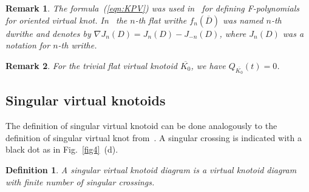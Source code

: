 \documentclass[11pt]{amsart}
\theoremstyle{noparens}
\newtheorem{remark}{Remark}[section]
\newtheorem{definition}{Definition}[section]
\numberwithin{equation}{section}
\numberwithin{equation}{section}
\begin{document}
\begin{remark}{\rm 
The formula~(\ref{eqn:KPV})  was used in~\cite{KPV} for defining F-polynomials for oriented virtual knot. In~\cite{KPV} the $n$-th flat writhe $f_n (\overline{D})$ was named $n$-th dwrithe and denotes by $\nabla J_n(D) = J_n(D) - J_{-n}(D)$, where $J_n(D)$ was a notation for $n$-th writhe. 
}
\end{remark}

\begin{remark} {\rm 
For the trivial flat virtual knotoid $\overline{K_0}$, we have $Q _ {\overline{K_0}} ( t )=0$.
} 
\end{remark}

\subsection{Singular virtual knotoids}

The definition of singular virtual knotoid can be done analogously to the definition of singular virtual knot from~\cite{Hen}. A singular crossing is indicated with a black dot as in Fig.~\ref{fig4}~(d).  

\begin{definition} {\rm 
A \textit{singular virtual knotoid diagram} is a virtual knotoid diagram with finite number of \textit{singular crossings}.
}
\end{definition}
\end{document}

